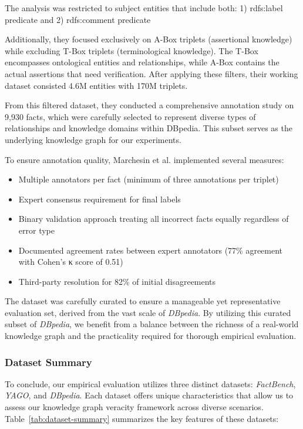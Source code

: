 The analysis was restricted to subject entities that include both: 1) rdfs:label predicate and 2) rdfs:comment predicate

Additionally, they focused exclusively on A-Box triplets (assertional knowledge) while excluding T-Box triplets (terminological knowledge).
The T-Box encompasses ontological entities and relationships, while A-Box contains the actual assertions that need verification.
After applying these filters, their working dataset consisted 4.6M entities with 170M triplets.

From this filtered dataset, they conducted a comprehensive annotation study on 9,930 facts, which were carefully selected to represent diverse types of relationships and knowledge domains within DBpedia.
This subset serves as the underlying knowledge graph for our experiments.

To ensure annotation quality, Marchesin et al. implemented several measures:
\begin{itemize}
    \item Multiple annotators per fact (minimum of three annotations per triplet)
    \item Expert consensus requirement for final labels
    \item Binary validation approach treating all incorrect facts equally regardless of error type
    \item Documented agreement rates between expert annotators (77\% agreement with Cohen's κ score of 0.51)
    \item Third-party resolution for 82\% of initial disagreements
\end{itemize}

The dataset was carefully curated to ensure a manageable yet representative evaluation set, derived from the vast scale of \textit{DBpedia}.
By utilizing this curated subset of \textit{DBpedia}, we benefit from a balance between the richness of a real-world knowledge graph and the practicality required for thorough empirical evaluation.

\subsubsection{Dataset Summary}\label{subsubsec:empirical-evaluation:dataset-analysis:dbpedia:summary}
To conclude, our empirical evaluation utilizes three distinct datasets: \textit{FactBench}, \textit{YAGO}, and \textit{DBpedia}.
Each dataset offers unique characteristics that allow us to assess our knowledge graph veracity framework across diverse scenarios.
Table~\ref{tab:dataset-summary} summarizes the key features of these datasets:

